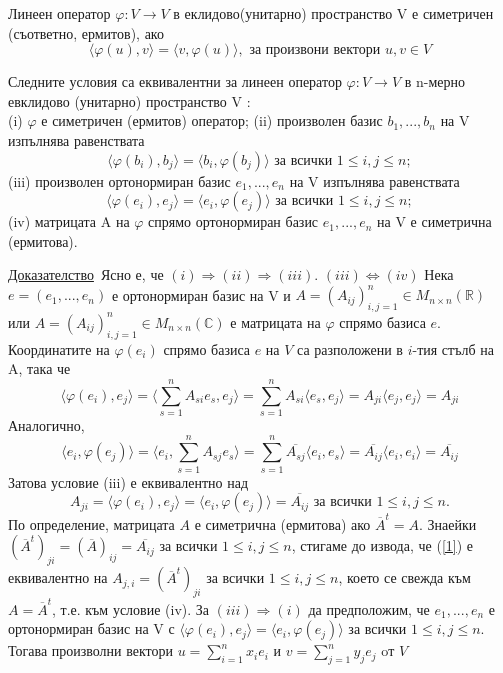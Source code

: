 \documentclass{article}
\newcommand*{\bC}{\mathbb{C}}
\newcommand*{\bR}{\mathbb{R}}
\newcommand*{\mat}[2]{M_{{#1}\times {#2}}}
\newcommand*{\ska}[2]{\langle #1, #2 \rangle}
\newcommand{\dok}{\underline{Доказателство}\  }
\newcommand{\tvurdenie}[2]{
    \begin{tcolorbox}[title = #1 ,colframe = blue!70!black, colback = blue!10!white]
        #2
    \end{tcolorbox}
}
\newcommand{\opredelenie}[2]{
    \begin{tcolorbox}[title = #1 ,colframe = red!70!black, colback = red!10!white]
        #2
    \end{tcolorbox}
}
\begin{document}
\opredelenie{Определение 22.3}{
    Линеен оператор $\varphi: V\rightarrow V$ в еклидово(унитарно) пространство V е
    симетричен (съответно, ермитов), ако
    \[
        \langle\varphi(u),v\rangle=\langle v,\varphi(u)\rangle, \text{  за произвони вектори  } u,v\in V
    \]
}
\tvurdenie{Твърдение 22.4}{
    Следните условия са еквивалентни за линеен оператор $\varphi: V\rightarrow V$ в n-мерно
    евклидово (унитарно) пространство V :\\
    (i) $\varphi$ е симетричен (ермитов) оператор;
    (ii) произволен базис $b_1,..., b_n$ на V изпълнява равенствата
    \[
        \langle\varphi(b_i), b_j\rangle=\langle b_i, \varphi(b_j)\rangle \text{  за всички } 1 \leq i, j \leq n;
    \]
    (iii) произволен ортонормиран базис $e_1,..., e_n$ на V изпълнява равенствата
    \[
        \langle\varphi(e_i), e_j\rangle=\langle e_i, \varphi(e_j)\rangle \text{  за всички } 1 \leq i, j \leq n;
    \]
    (iv) матрицата A на $\varphi$ спрямо ортонормиран базис $e_1,..., e_n$ на V е
    симетрична (ермитова).
}
\dok Ясно е, че $(i) \Rightarrow (ii) \Rightarrow (iii)$.
$(iii) \Leftrightarrow (iv)$ Нека $e = (e_1, . . . , e_n)$ е ортонормиран базис на V и
$A = (A_{ij})^n_{i,j=1} \in\mat{n}{n}(\bR)$ или $A = (A_{ij})^n_{i,j=1} \in\mat{n}{n}(\bC)$
е матрицата на $\varphi$ спрямо базиса $e$. Координатите на $\varphi(e_i)$ спрямо
базиса $e$ на $V$ са разположени в $i$-тия стълб на A, така че
\[
    \ska{\varphi(e_i)}{e_j}=\ska{\sum_{s=1}^{n}A_{si}e_s}{e_j}=\sum_{s=1}^{n}A_{si}\ska{e_s}{e_j}=
    A_{ji}\ska{e_j}{e_j}=A_{ji}
\]
Аналогично,
\[
    \ska{e_i}{\varphi(e_j)}=\ska{e_i}{\sum_{s=1}^{n}A_{sj}e_s}=\sum_{s=1}^{n}\overline{A_{sj}}\ska{e_i}{e_s}=
    \overline{A_{ij}}\ska{e_i}{e_i}=\overline{A_{ij  }}
\]
Затова условие (iii) е еквивалентно над
\begin{equation*}\label{1}
    A_{ji}=\ska{\varphi(e_i)}{e_j}=\ska{e_i}{\varphi(e_j)}=\overline{A_{ij}} \text{ \  за всички  \ } 1\leq i,j \leq n.
\end{equation*}
По определение, матрицата $A$ е симетрична (ермитова) ако $\overline{A}^t = A$. Знаейки $(\overline{A}^t)_{ji} = (\overline{A})_{ij} = \overline{A_{ij}}$ за всички
$1 \leq i, j \leq n$, стигаме до извода, че (\ref*{1}) е еквивалентно на $A_{j,i} = (\overline{A}^t)_{ji}$
за всички $1 \leq i, j \leq n$, което се свежда към $A = \overline{A}^t$, т.е. към условие (iv).
За $(iii) \Rightarrow (i)$ да предположим, че $e_1,..., e_n$ е ортонормиран базис на V с
$\ska{\varphi(e_i)}{e_j} = \ska{e_i}{\varphi(e_j)}$ за всички $1 \leq i, j \leq n$.
Тогава произволни вектори $u = \sum^n_{i=1}x_ie_i$ и $v = \sum^n_{j=1}y_je_j$ oт $V$
\end{document}
